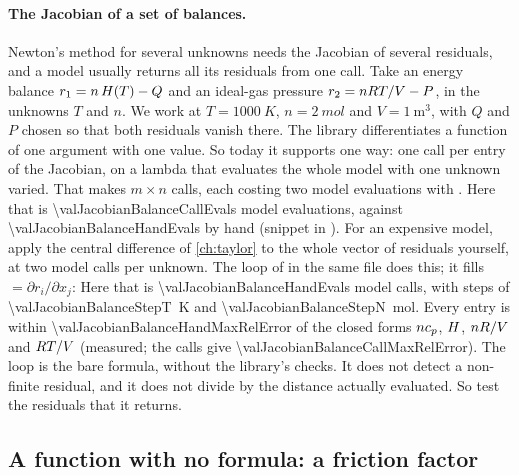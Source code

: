 \paragraph{The Jacobian of a set of balances.} Newton's method for several unknowns needs the Jacobian of several
residuals, and a model usually returns all its residuals from one call. Take an energy balance
$r_1 = n\,H(T) - Q$ and an ideal-gas pressure $r_2 = n R T / V - P$, in the unknowns $T$ and $n$. We work at
$T = \SI{1000}{K}$, $n = \SI{2}{mol}$ and $V = \SI{1}{\metre\cubed}$, with $Q$ and $P$ chosen so that both residuals
vanish there. The library differentiates a function of one argument with one value. So today it supports one way:
one  call per entry of the Jacobian, on a lambda that evaluates the whole model with one unknown
varied. That makes $m \times n$ calls, each costing two model evaluations with . Here that is
\num{\valJacobianBalanceCallEvals} model evaluations, against \num{\valJacobianBalanceHandEvals} by hand (snippet
 in ). For an expensive model, apply the central difference
of \cref{ch:taylor} to the whole vector of residuals yourself, at two model calls per unknown. The loop of
 in the same file does this; it fills  $= \partial r_i / \partial x_j$:
Here that is \num{\valJacobianBalanceHandEvals} model calls, with steps of \SI{\valJacobianBalanceStepT}{K} and
\SI{\valJacobianBalanceStepN}{mol}. Every entry is within \num{\valJacobianBalanceHandMaxRelError} of the closed
forms $n c_p$, $H$, $n R / V$ and $R T / V$ (measured; the calls give
\num{\valJacobianBalanceCallMaxRelError}). The loop is the bare formula, without the library's checks. It does not
detect a non-finite residual, and it does not divide by the distance actually evaluated. So test the residuals that
it returns.

\subsection{A function with no formula: a friction factor}\label{sec:using-solver}

